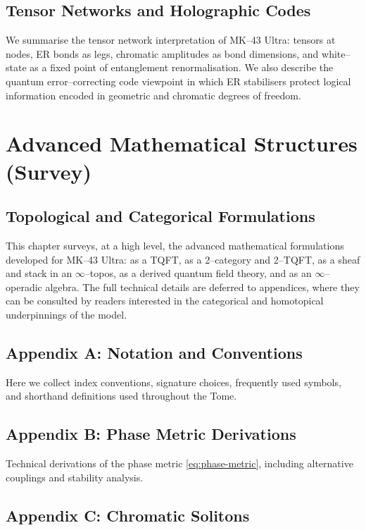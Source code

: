 \chapter{Tensor Networks and Holographic Codes}

We summarise the tensor network interpretation of MK--43 Ultra:
tensors at nodes, ER bonds as legs, chromatic amplitudes as bond dimensions, and white--state as a fixed point of entanglement renormalisation.
We also describe the quantum error--correcting code viewpoint in which ER stabilisers protect logical information encoded in geometric and chromatic degrees of freedom.

\part{Advanced Mathematical Structures (Survey)}

\chapter{Topological and Categorical Formulations}

This chapter surveys, at a high level, the advanced mathematical formulations developed for MK--43 Ultra:
as a TQFT, as a 2--category and 2--TQFT, as a sheaf and stack in an $\infty$--topos, as a derived quantum field theory, and as an $\infty$--operadic algebra.
The full technical details are deferred to appendices, where they can be consulted by readers interested in the categorical and homotopical underpinnings of the model.

\appendix

\chapter{Appendix A: Notation and Conventions}

Here we collect index conventions, signature choices, frequently used symbols, and shorthand definitions used throughout the Tome.

\chapter{Appendix B: Phase Metric Derivations}

Technical derivations of the phase metric \eqref{eq:phase-metric}, including alternative couplings and stability analysis.

\chapter{Appendix C: Chromatic Solitons}

